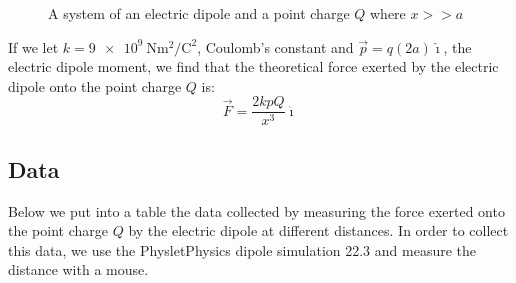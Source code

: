 \documentclass[12pt]{article}
\newcommand*{\I}{\imath}
\begin{document}
\begin{figure}[H]
    \centering

    \caption[10pt]{A system of an electric dipole and a point charge $Q$ where $x>>a$}

\end{figure}

If we let $k = \SI{9e+9}{\newton\metre\squared\per\coulomb\squared}$, Coulomb's constant and $\vec{p} = q(2a)\hat{\I}$, the electric dipole moment, we find that the theoretical force exerted by the electric dipole onto the point charge $Q$ is:
\begin{equation} \label{eq1}
    \vec{F} = \frac{2k p Q}{x^3} \hat{\I}
\end{equation}


\subsection{Data}
Below we put into a table the data collected by measuring the force exerted onto the point charge $Q$ by the electric dipole at different distances. In order to collect this data, we use the Physlet\textregistered \space Physics dipole simulation 22.3 and measure the distance with a mouse.

\setlength{\tabcolsep}{2pt}
\renewcommand{\arraystretch}{1.2}
\end{document}

